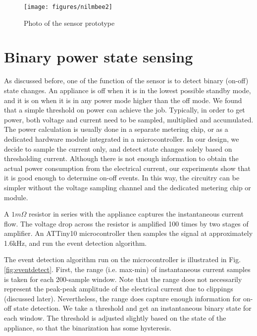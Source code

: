 \begin{figure}[htb]
  \centering
  \texttt{[image: figures/nilmbee2]}
  \caption{Photo of the sensor prototype}
  \label{fig:sensor}
\end{figure}

\section{Binary power state sensing}

As discussed before, one of the function of the sensor is to detect binary (on-off) state changes. An appliance is off when it is in the lowest possible standby mode, and it is on when it is in any power mode higher than the off mode. We found that a simple threshold on power can achieve the job. Typically, in order to get power, both voltage and current need to be sampled, multiplied and accumulated. The power calculation is usually done in a separate metering chip, or as a dedicated hardware module integrated in a microcontroller. In our design, we decide to sample the current only, and detect state changes solely based on thresholding current. Although there is not enough information to obtain the actual power consumption from the electrical current, our experiments show that it is good enough to determine on-off events. In this way, the circuitry can be simpler without the voltage sampling channel and the dedicated metering chip or module. 

A $1m\Omega$ resistor in series with the appliance captures the instantaneous current flow. The voltage drop across the resistor is amplified 100 times by two stages of amplifier. An ATTiny10 microcontroller then samples the signal at approximately 1.6kHz, and run the event detection algorithm. 

The event detection algorithm run on the microcontroller is illustrated in Fig.\ref{fig:eventdetect}. First, the range (i.e. max-min) of instantaneous current samples is taken for each 200-sample window. Note that the range does not necessarily represent the peak-peak amplitude of the electrical current due to clippings (discussed later). Nevertheless, the range does capture enough information for on-off state detection. We take a threshold and get an instantaneous binary state for each window. The threshold is adjusted slightly based on the state of the appliance, so that the binarization has some hysteresis. 

